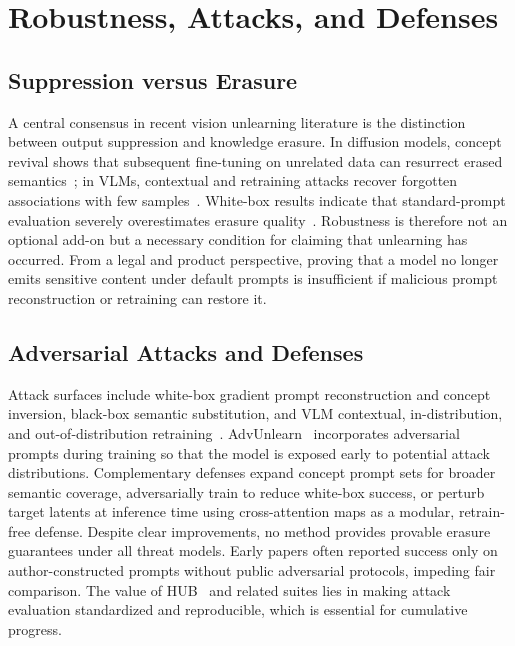 \documentclass[10pt,twocolumn,letterpaper]{article}
\begin{document}
\section{Robustness, Attacks, and Defenses}

\subsection{Suppression versus Erasure}

A central consensus in recent vision unlearning literature is the distinction between output suppression and knowledge erasure. In diffusion models, concept revival shows that subsequent fine-tuning on unrelated data can resurrect erased semantics~\cite{safavigerdini2026}; in VLMs, contextual and retraining attacks recover forgotten associations with few samples~\cite{lin2026vlm}. White-box results indicate that standard-prompt evaluation severely overestimates erasure quality~\cite{moon2025hub}. Robustness is therefore not an optional add-on but a necessary condition for claiming that unlearning has occurred. From a legal and product perspective, proving that a model no longer emits sensitive content under default prompts is insufficient if malicious prompt reconstruction or retraining can restore it.

\subsection{Adversarial Attacks and Defenses}

Attack surfaces include white-box gradient prompt reconstruction and concept inversion, black-box semantic substitution, and VLM contextual, in-distribution, and out-of-distribution retraining~\cite{lin2026vlm,safavigerdini2026}. AdvUnlearn~\cite{zhang2024advunlearn} incorporates adversarial prompts during training so that the model is exposed early to potential attack distributions. Complementary defenses expand concept prompt sets for broader semantic coverage, adversarially train to reduce white-box success, or perturb target latents at inference time using cross-attention maps as a modular, retrain-free defense. Despite clear improvements, no method provides provable erasure guarantees under all threat models. Early papers often reported success only on author-constructed prompts without public adversarial protocols, impeding fair comparison. The value of HUB~\cite{moon2025hub} and related suites lies in making attack evaluation standardized and reproducible, which is essential for cumulative progress.
\end{document}
